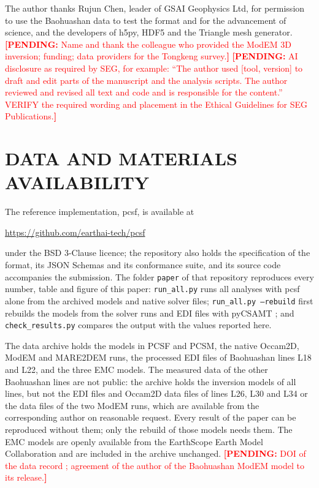 \documentclass[manuscript]{geophysics}
\newif\ifreview
\DeclareRobustCommand{\pending}[1]{\textcolor{red}{\textbf{[PENDING:} #1\textbf{]}}}
\newcommand{\code}[1]{\texttt{#1}}
\begin{document}
The author thanks Rujun Chen, leader of GSAI Geophysics Ltd, for
permission to use the Baohuashan data to test the format and for the
advancement of science, and the developers of h5py, HDF5 and the
Triangle mesh generator.
\pending{Name and thank the colleague who provided the ModEM 3D
inversion; funding; data providers for the Tongkeng survey.}
\pending{AI disclosure as required by SEG, for example: ``The author
used [tool, version] to draft and edit parts of the manuscript and the
analysis scripts. The author reviewed and revised all text and code
and is responsible for the content.'' VERIFY the required wording and
placement in the Ethical Guidelines for SEG Publications.}
\fi

\section{DATA AND MATERIALS AVAILABILITY}

The reference implementation, pcsf, is available at
\ifreview
\pending{anonymised review link (Zenodo restricted access or
anonymous.4open.science)}
\else
\url{https://github.com/earthai-tech/pcsf}
\fi
under the BSD 3-Clause licence; the repository also holds the
specification of the format, its JSON Schemas and its conformance
suite, and its source code accompanies the submission. The folder
\code{paper} of that repository reproduces every number, table and
figure of this paper: \code{run\_all.py} runs all analyses with pcsf
alone from the archived models and native solver files;
\code{run\_all.py --rebuild} first rebuilds the models from the solver
runs and EDI files with pyCSAMT \citep{Kouadio2022,Kouadio2026Zenodo};
and \code{check\_results.py} compares the output with the values
reported here.

The data archive \citep{PCSFdata} holds the models in PCSF and PCSM,
the native Occam2D, ModEM and MARE2DEM runs, the processed EDI files of
Baohuashan lines L18 and L22, and the three EMC models. The measured
data of the other Baohuashan lines are not public: the archive holds
the inversion models of all lines, but not the EDI files and Occam2D
data files of lines L26, L30 and L34 or the data files of the two
ModEM runs, which are available from the corresponding author on
reasonable request. Every result of the paper can be reproduced
without them; only the rebuild of those models needs them. The EMC
models are openly available from the EarthScope Earth Model
Collaboration \citep{EMC_MCR,EMC_THO,EMC_WUS} and are included in the
archive unchanged.
\pending{DOI of the data record \citep{PCSFdata}; agreement of the
author of the Baohuashan ModEM model to its release.}
\end{document}

